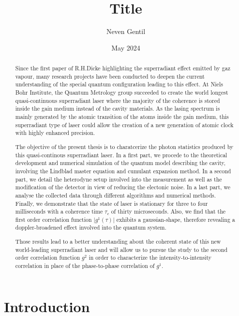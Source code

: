 \documentclass[10pt]{report}
\begin{document}
\title{Title}
\author{Neven Gentil}
\date{May 2024}
\maketitle

\begin{abstract}
Since the first paper of R.H.Dicke highlighting the superradiant effect emitted by gaz vapour, many research projects have been conducted to deepen the current understanding of the special quantum configuration leading to this effect. At Niels Bohr Institute, the Quantum Metrology group succeeded to create the world longest quasi-continuous superradiant laser where the majority of the coherence is stored inside the gain medium instead of the cavity materials. As the lasing spectrum is mainly generated by the atomic transition of the atoms inside the gain medium, this superradiant type of laser could allow the creation of a new generation of atomic clock with highly enhanced precision. 

The objective of the present thesis is to charatcerize the photon statistics produced by this quasi-continous superradiant laser. In a first part, we procede to the theoretical development and numerical simulation of the quantum model describing the cavity, involving the Lindblad master equation and cumulant expansion method. In a second part, we detail the heterodyne setup involved into the measurement as well as the modification of the detector in view of reducing the electonic noise. In a last part, we analyse the collected data through different algorithms and numerical methods. Finally, we demonstrate that the state of laser is stationary for three to four milliseconds with a coherence time $\tau_c$ of thirty microseconds. Also, we find that the first order correlation function $\vert g^1(\tau) \vert$ exhibits a gaussian-shape, therefore revealing a doppler-broadened effect involved into the quantum system.

Those results lead to a better understanding about the coherent state of this new world-leading superradiant laser and will allow us to pursue the study to the second order correlation function $g^2$ in order to characterize the intensity-to-intensity correlation in place of the phase-to-phase correlation of $g^1$.
\end{abstract}

\chapter{Introduction}
\end{document}
